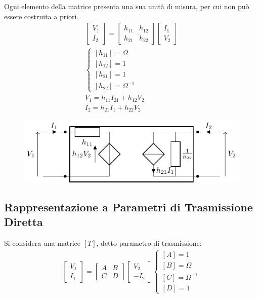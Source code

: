 \documentclass{article}
\numberwithin{equation}{subsection}
\begin{document}
Ogni elemento della matrice presenta una sua unità di misura, per cui non può essere costruita a priori. 
\begin{gather*}
    \begin{bmatrix}
        V_1\\I_2
    \end{bmatrix}=\begin{bmatrix}
        h_{11}&h_{12}\\h_{21}&h_{22}
    \end{bmatrix}\begin{bmatrix}
        I_1\\V_2
    \end{bmatrix}\\
    \begin{cases}
        [h_{11}]=\Omega\\
        [h_{12}]=1\\
        [h_{21}]=1\\
        [h_{22}]=\Omega^{-1}
    \end{cases}\\
    V_1=h_{11}I_21+h_{12}V_2\\
    I_2=h_{21}I_1+h_{22}V_2
\end{gather*}

\begin{figure}[H]%
    \centering
    \includegraphics{rappresentazione-parametri-ibridi.pdf}%
    \label{fig:rappresentazione-parametri-ibdridi}
\end{figure}

\subsection{Rappresentazione a Parametri di Trasmissione Diretta}

Si considera una matrice $[T]$, detto parametro di trasmissione:
\begin{gather*}
    \begin{bmatrix}
        V_1\\I_1
    \end{bmatrix}=\begin{bmatrix}
        A&B\\C&D
    \end{bmatrix}\begin{bmatrix}
        V_2\\-I_2
    \end{bmatrix}
    \begin{cases}
        [A]=1\\
        [B]=\Omega\\
        [C]=\Omega^{-1}\\
        [D]=1
    \end{cases}
\end{gather*}
\end{document}
